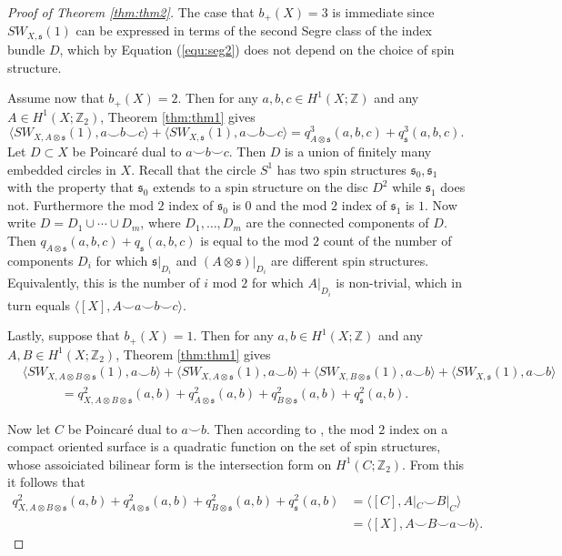 \documentclass{amsart}
\theoremstyle{definition}
\theoremstyle{remark}
\numberwithin{equation}{section}
\begin{document}
\begin{proof}[Proof of Theorem \ref{thm:thm2}] 
The case that $b_+(X) = 3$ is immediate since $SW_{X,\mathfrak{s}}(1)$ can be expressed in terms of the second Segre class of the index bundle $D$, which by Equation (\ref{equ:seg2}) does not depend on the choice of spin structure.

Assume now that $b_+(X) = 2$. Then for any $a,b,c \in H^1(X ; \mathbb{Z})$ and any $A \in H^1(X ; \mathbb{Z}_2)$, Theorem \ref{thm:thm1} gives
\[
\langle SW_{X,A \otimes \mathfrak{s}}(1) , a \smallsmile b \smallsmile c \rangle + \langle SW_{X,\mathfrak{s}}(1) , a \smallsmile b \smallsmile c \rangle = q^3_{A \otimes \mathfrak{s}}(a , b , c) + q^3_{\mathfrak{s}}(a , b , c).
\]
Let $D \subset X$ be Poincar\'e dual to $a \smallsmile b \smallsmile c$. Then $D$ is a union of finitely many embedded circles in $X$. Recall that the circle $S^1$ has two spin structures $\mathfrak{s}_0, \mathfrak{s}_1$ with the property that $\mathfrak{s}_0$ extends to a spin structure on the disc $D^2$ while $\mathfrak{s}_1$ does not. Furthermore the mod $2$ index of $\mathfrak{s}_0$ is $0$ and the mod $2$ index of $\mathfrak{s}_1$ is $1$. Now write $D = D_1 \cup \cdots \cup D_m$, where $D_1, \dots , D_m$ are the connected components of $D$. Then $q_{A \otimes \mathfrak{s}}(a , b , c) + q_{\mathfrak{s}}(a , b , c)$ is equal to the mod $2$ count of the number of components $D_i$ for which $\mathfrak{s}|_{D_i}$ and $(A \otimes \mathfrak{s})|_{D_i}$ are different spin structures. Equivalently, this is the number of $i$ mod $2$ for which $A|_{D_i}$ is non-trivial, which in turn equals $\langle [X] , A \smallsmile a \smallsmile b \smallsmile c \rangle$.

Lastly, suppose that $b_+(X) = 1$. Then for any $a,b \in H^1(X ; \mathbb{Z})$ and any $A,B \in H^1(X ; \mathbb{Z}_2)$, Theorem \ref{thm:thm1} gives
\begin{align*}
& \langle SW_{X , A \otimes B \otimes \mathfrak{s}}(1) , a \smallsmile b \rangle + \langle SW_{X , A \otimes \mathfrak{s}}(1) , a \smallsmile b \rangle + \langle SW_{X , B \otimes \mathfrak{s}}(1) , a \smallsmile b \rangle + \langle SW_{X , \mathfrak{s}}(1) , a \smallsmile b \rangle \\
& \quad \quad \quad  =  q^2_{X , A \otimes B \otimes \mathfrak{s}}(a , b) + q^2_{A \otimes \mathfrak{s}}(a , b) + q^2_{B \otimes \mathfrak{s}}(a , b) + q^2_{\mathfrak{s}}(a , b).
\end{align*}

Now let $C$ be Poincar\'e dual to $a \smallsmile b$. Then according to \cite[Theorem 2]{at2}, the mod $2$ index on a compact oriented surface is a quadratic function on the set of spin structures, whose assoiciated bilinear form is the intersection form on $H^1(C ; \mathbb{Z}_2)$. From this it follows that
\begin{align*}
q^2_{X , A \otimes B \otimes \mathfrak{s}}(a , b) + q^2_{A \otimes \mathfrak{s}}(a , b) + q^2_{B \otimes \mathfrak{s}}(a , b) + q^2_{\mathfrak{s}}(a , b) &= \langle [C] , A|_C \smallsmile B|_C \rangle \\
&= \langle [X] , A \smallsmile B \smallsmile a \smallsmile b \rangle.
\end{align*}


\end{proof}
\end{document}

